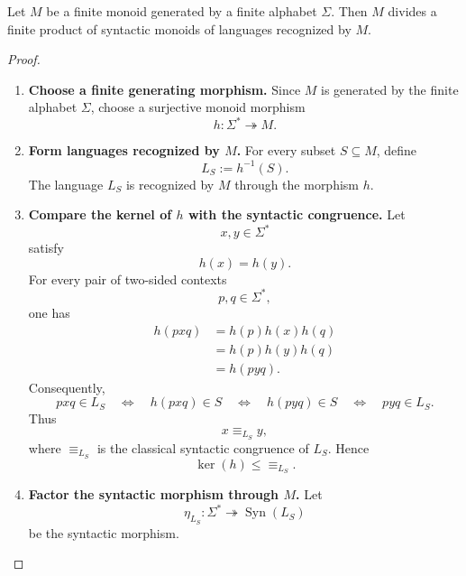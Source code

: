 \begin{lemma}
\label{lem:to-finite-monoid-syntactic-generation}
    Let \(M\) be a finite monoid generated by a finite alphabet \(\Sigma\).
    Then \(M\) divides a finite product of syntactic monoids of languages
    recognized by \(M\).
\end{lemma}

\begin{proof}
    \leavevmode
    \begin{enumerate}
        \item \textbf{Choose a finite generating morphism.}
        Since \(M\) is generated by the finite alphabet \(\Sigma\), choose a
        surjective monoid morphism
        \[
            h:\Sigma^*\twoheadrightarrow M.
        \]

        \item \textbf{Form languages recognized by \(M\).}
        For every subset \(S\subseteq M\), define
        \[
            L_S:=h^{-1}(S).
        \]
        The language \(L_S\) is recognized by \(M\) through the morphism
        \(h\).

        \item \textbf{Compare the kernel of \(h\) with the syntactic
        congruence.}
        Let
        \[
            x,y\in\Sigma^*
        \]
        satisfy
        \[
            h(x)=h(y).
        \]
        For every pair of two-sided contexts
        \[
            p,q\in\Sigma^*,
        \]
        one has
        \[
        \begin{aligned}
            h(pxq)
            &=
            h(p)h(x)h(q)
            \\
            &=
            h(p)h(y)h(q)
            \\
            &=
            h(pyq).
        \end{aligned}
        \]
        Consequently,
        \[
            pxq\in L_S
            \quad\Longleftrightarrow\quad
            h(pxq)\in S
            \quad\Longleftrightarrow\quad
            h(pyq)\in S
            \quad\Longleftrightarrow\quad
            pyq\in L_S.
        \]
        Thus
        \[
            x\equiv_{L_S}y,
        \]
        where \(\equiv_{L_S}\) is the classical syntactic congruence of
        \(L_S\). Hence
        \[
            \ker(h)
            \leq
            {\equiv}_{L_S}.
        \]

        \item \textbf{Factor the syntactic morphism through \(M\).}
        Let
        \[
            \eta_{L_S}:
            \Sigma^*
            \twoheadrightarrow
            \operatorname{Syn}(L_S)
        \]
        be the syntactic morphism.


\end{enumerate}
\end{proof}
